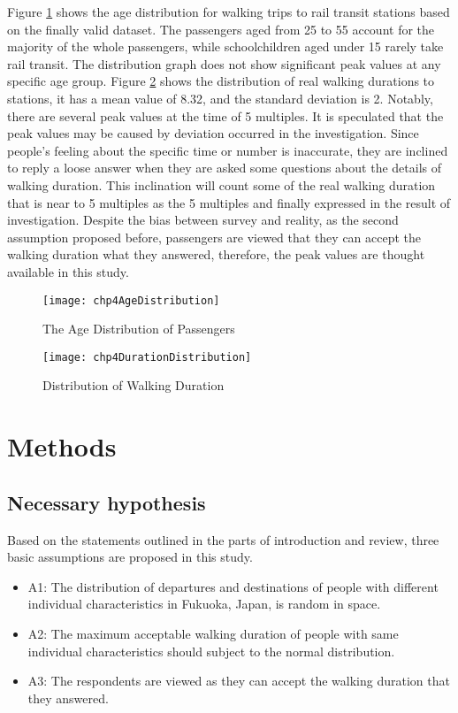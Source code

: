 %
Figure \ref{fig:chp4:AgeDistribution} shows the age distribution for walking trips to rail transit stations based on the finally valid dataset. The passengers aged from 25 to 55 account for the majority of the whole passengers, while schoolchildren aged under 15 rarely take rail transit. The distribution graph does not show significant peak values at any specific age group. Figure \ref{fig:chp4:DurationDistribution} shows the distribution of real walking durations to stations, it has a mean value of 8.32, and the standard deviation is 2. Notably, there are several peak values at the time of 5 multiples. It is speculated that the peak values may be caused by deviation occurred in the investigation. Since people's feeling about the specific time or number is inaccurate, they are inclined to reply a loose answer when they are asked some questions about the details of walking duration. This inclination will count some of the real walking duration that is near to 5 multiples as the 5 multiples and finally expressed in the result of investigation. Despite the bias between survey and reality, as the second assumption proposed before, passengers are viewed that they can accept the walking duration what they answered, therefore, the peak values are thought available in this study.

\begin{figure}[htbp]
	\centering
	\texttt{[image: chp4AgeDistribution]}
	\caption{The Age Distribution of Passengers}
	\label{fig:chp4:AgeDistribution}
\end{figure}

\begin{figure}[htbp]
	\centering
	\texttt{[image: chp4DurationDistribution]}
	\caption{Distribution of Walking Duration}
	\label{fig:chp4:DurationDistribution}
\end{figure}

%
\section{Methods}
%
\subsection{Necessary hypothesis}
Based on the statements outlined in the parts of introduction and review, three basic assumptions are proposed in this study.

\begin{itemize}
	\item A1: The distribution of departures and destinations of people with different individual characteristics in Fukuoka, Japan, is random in space. 
	
	\item A2: The maximum acceptable walking duration of people with same individual characteristics should subject to the normal distribution. 
	
	\item A3: The respondents are viewed as they can accept the walking duration that they answered.
\end{itemize}


